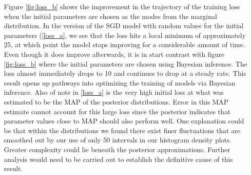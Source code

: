 \documentclass[review]{siamart190516}
\begin{document}
Figure \ref{fig:loss_b} shows the improvement in the trajectory of the training loss when the initial parameters are chosen as the modes from the marginal distribution. In the version of the SGD model with random values for the initial parameters (\ref{loss_a}, we see that the loss hits a local minimum of approximately 25, at which point the model stops improving for a considerable amount of time. Even though it does improve afterwards, it is in start contrast with figure \ref{fig:loss_b} where the initial parameters are chosen using Bayesian inference. The loss almost immediately drops to 10 and continues to drop at a steady rate. This result opens up pathways into optimizing the training of models via Bayesian inference. 
\newline
Also of note in \ref{loss_a} is the very high initial loss at what was estimated to be the MAP of the posterior distributions. Error in this MAP estimate cannot account for this large loss since the posterior indicates that parameter values close to MAP should also perform well. One explanation could be that within the distributions we found there exist finer fluctuations that are smoothed out by our use of only 50 intervals in our histogram density plots. Greater complexity could lie beneath the posterior approximations. Further analysis would need to be carried out to establish the definitive cause of this result. 
\end{document}
